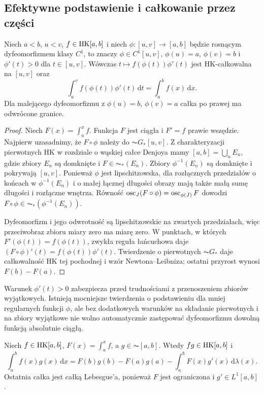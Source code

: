 \subsection*{Efektywne podstawienie i całkowanie przez części}
\begin{twierdzenie}\label{tw:hk-podstawienie}
Niech $a<b$, $u<v$, $f\in\mathrm{HK}[a,b]$ i niech $\phi:[u,v]\to[a,b]$ będzie rosnącym dyfeomorfizmem klasy $C^1$, to znaczy $\phi\in C^1[u,v]$, $\phi(u)=a$, $\phi(v)=b$ i $\phi'(t)>0$ dla $t\in[u,v]$. Wówczas $t\mapsto f(\phi(t))\phi'(t)$ jest HK-całkowalna na $[u,v]$ oraz
\[
\int_u^v f(\phi(t))\phi'(t)\,\mathrm dt=\int_a^b f(x)\,\mathrm dx.
\]
Dla malejącego dyfeomorfizmu z $\phi(u)=b$, $\phi(v)=a$ całka po prawej ma odwrócone granice.
\end{twierdzenie}
\begin{proof}
Niech $F(x)=\int_a^x f$. Funkcja $F$ jest ciągła i $F'=f$ prawie wszędzie. Najpierw uzasadnimy, że $F\circ\phi$ należy do $\AC G_*[u,v]$. Z charakteryzacji pierwotnych HK w rozdziale o wąskiej całce Denjoya mamy $[a,b]=\bigcup_n E_n$, gdzie zbiory $E_n$ są domknięte i $F\in\AC_*(E_n)$. Zbiory $\phi^{-1}(E_n)$ są domknięte i pokrywają $[u,v]$. Ponieważ $\phi$ jest lipschitzowska, dla rozłącznych przedziałów o końcach w $\phi^{-1}(E_n)$ i o małej łącznej długości obrazy mają także małą sumę długości i rozłączne wnętrza. Równość
$\operatorname{osc}_J(F\circ\phi)=\operatorname{osc}_{\phi(J)}F$ dowodzi $F\circ\phi\in\AC_*(\phi^{-1}(E_n))$.

Dyfeomorfizm i jego odwrotność są lipschitzowskie na zwartych przedziałach, więc przeciwobraz zbioru miary zero ma miarę zero. W punktach, w których $F'(\phi(t))=f(\phi(t))$, zwykła reguła łańcuchowa daje $(F\circ\phi)'(t)=f(\phi(t))\phi'(t)$. Twierdzenie o pierwotnych $\AC G_*$ daje całkowalność HK tej pochodnej i wzór Newtona--Leibniza; ostatni przyrost wynosi $F(b)-F(a)$.
\end{proof}
\begin{uwaga}
Warunek $\phi'(t)>0$ zabezpiecza przed trudnościami z przenoszeniem zbiorów wyjątkowych. Istnieją mocniejsze twierdzenia o podstawieniu dla mniej regularnych funkcji $\phi$, ale bez dodatkowych warunków na składanie pierwotnych i na zbiory wyjątkowe nie wolno automatycznie zastępować dyfeomorfizmu dowolną funkcją absolutnie ciągłą.
\end{uwaga}
\begin{wniosek}\label{wn:hk-ibp-ac}
Niech $f\in\mathrm{HK}[a,b]$, $F(x)=\int_a^x f$, a $g\in\AC[a,b]$. Wtedy $fg\in\mathrm{HK}[a,b]$ i
\[
\int_a^b f(x)g(x)\,\mathrm dx=F(b)g(b)-F(a)g(a)-\int_a^b F(x)g'(x)\,\mathrm d\lambda(x).
\]
Ostatnia całka jest całką Lebesgue'a, ponieważ $F$ jest ograniczona i $g'\in L^1[a,b]$.
\end{wniosek}
